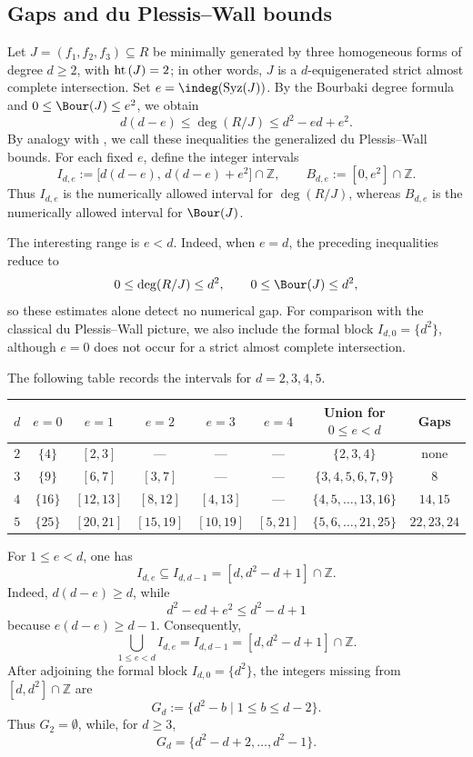 \documentclass[11pt]{amsart} %
\theoremstyle{definition}
\def\hht{{\rm ht}\,}
\def\syz{\mbox{\rm Syz}}
\def\hht{{\rm ht}\,}
\begin{document}
\subsection{Gaps and du Plessis--Wall bounds}\label{num-gaps}

Let $J=(f_1,f_2,f_3)\subseteq R$ be minimally generated by three
homogeneous forms of degree $d\ge2$, with $\hht(J)=2$; in other words,
$J$ is a $d$-equigenerated strict almost complete intersection. Set
$e=\indeg(\syz(J))$. By the Bourbaki degree formula and $0\le\Bour(J)\le e^2$, we obtain
\[
d(d-e)\le\deg(R/J)\le d^2-ed+e^2.
\]
By analogy with \cite{CTC-Plessis}, we call these inequalities the
generalized du Plessis--Wall bounds. For each fixed $e$, define the
integer intervals
\[
I_{d,e}:=\bigl[d(d-e),\,d(d-e)+e^2\bigr]\cap\mathbb Z,
\qquad
B_{d,e}:=[0,e^2]\cap\mathbb Z.
\]
Thus $I_{d,e}$ is the numerically allowed interval for $\deg(R/J)$,
whereas $B_{d,e}$ is the numerically allowed interval for $\Bour(J)$.

The interesting range is $e<d$. Indeed, when $e=d$, the preceding
inequalities reduce to
\[
0\le\deg(R/J)\le d^2,
\qquad
0\le\Bour(J)\le d^2,
\]
so these estimates alone detect no numerical gap.
For comparison with the classical du Plessis--Wall picture, we also
include the formal block $I_{d,0}=\{d^2\}$, although $e=0$ does not
occur for a strict almost complete intersection.
\medskip

\noindent
The following table records the intervals for $d=2,3,4,5$.

\begin{table}[h]
\centering
\renewcommand{\arraystretch}{1.15}
\begin{tabular}{|c|c|c|c|c|c|c|c|}
$d$ & $e=0$ & $e=1$ & $e=2$ & $e=3$ & $e=4$
& Union for $0\le e<d$ & Gaps \\ \hline
$2$ & $\{4\}$ & $[2,3]$ & --- & --- & ---
& $\{2,3,4\}$ & none \\
$3$ & $\{9\}$ & $[6,7]$ & $[3,7]$ & --- & ---
& $\{3,4,5,6,7,9\}$ & $8$ \\
$4$ & $\{16\}$ & $[12,13]$ & $[8,12]$ & $[4,13]$ & ---
& $\{4,5,\ldots,13,16\}$ & $14,15$ \\
$5$ & $\{25\}$ & $[20,21]$ & $[15,19]$ & $[10,19]$ & $[5,21]$
& $\{5,6,\ldots,21,25\}$ & $22,23,24$
\end{tabular}
\end{table}

For $1\le e<d$, one has
\[
I_{d,e}\subseteq I_{d,d-1}=[d,d^2-d+1]\cap\mathbb Z.
\]
Indeed, $d(d-e)\ge d$, while
\[
d^2-ed+e^2\le d^2-d+1
\]
because $e(d-e)\ge d-1$. Consequently,
\[
\bigcup_{1\le e<d}I_{d,e}
=I_{d,d-1}
=[d,d^2-d+1]\cap\mathbb Z.
\]
After adjoining the formal block $I_{d,0}=\{d^2\}$, the integers missing
from $[d,d^2]\cap\mathbb Z$ are
\[
G_d:=\{d^2-b\mid 1\le b\le d-2\}.
\]
Thus $G_2=\emptyset$, while, for $d\ge3$,
\[
G_d=\{d^2-d+2,\ldots,d^2-1\}.
\]
\end{document}
